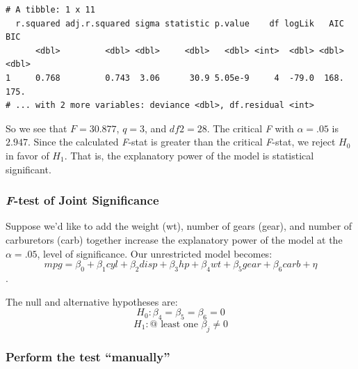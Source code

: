 \documentclass[]{book}
\begin{document}
\begin{verbatim}
# A tibble: 1 x 11
  r.squared adj.r.squared sigma statistic p.value    df logLik   AIC   BIC
      <dbl>         <dbl> <dbl>     <dbl>   <dbl> <int>  <dbl> <dbl> <dbl>
1     0.768         0.743  3.06      30.9 5.05e-9     4  -79.0  168.  175.
# ... with 2 more variables: deviance <dbl>, df.residual <int>
\end{verbatim}

So we see that \(F=30.877\), \(q=3\), and \(df2=28\). The critical \emph{F} with \(\alpha=.05\) is \(2.947\). Since the calculated \emph{F}-stat is greater than the critical \emph{F}-stat, we reject \(H_0\) in favor of \(H_1\). That is, the explanatory power of the model is statistical significant.

\hypertarget{f-test-of-joint-significance}{%
\subsubsection{\texorpdfstring{\emph{F}-test of Joint Significance}{F-test of Joint Significance}}\label{f-test-of-joint-significance}}

Suppose we'd like to add the weight (wt), number of gears (gear), and number of carburetors (carb) together increase the explanatory power of the model at the \(\alpha=.05\), level of significance. Our unrestricted model becomes: \[mpg=\beta_0+\beta_1cyl+\beta_2disp+\beta_3hp+\beta_4wt+\beta_5gear+\beta_6carb+\eta\].

The null and alternative hypotheses are: \[H_0:\beta_4=\beta_5=\beta_6=0\] \[H_1:\text{@ least one }\beta_j\ne0\]

\hypertarget{perform-the-test-manually}{%
\subsubsection{Perform the test ``manually''}\label{perform-the-test-manually}}
\end{document}
